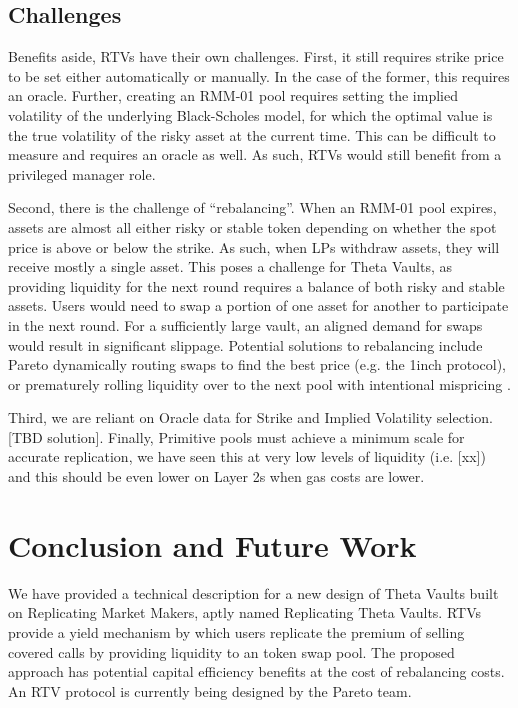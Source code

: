 \documentclass[hidelinks, 12pt]{article}
\begin{document}
\subsection{Challenges}
\label{Challenges}

Benefits aside, RTVs have their own challenges. First, it still requires strike price to be set either automatically or manually. In the case of the former, this requires an oracle. Further, creating an RMM-01 pool requires setting the implied volatility of the underlying Black-Scholes model, for which the optimal value is the true volatility of the risky asset at the current time. This can be difficult to measure and requires an oracle as well. As such, RTVs would still benefit from a privileged manager role.

Second, there is the challenge of ``rebalancing''. When an RMM-01 pool expires, assets are almost all either risky or stable token depending on whether the spot price is above or below the strike. As such, when LPs withdraw assets, they will receive mostly a single asset. This poses a challenge for Theta Vaults, as providing liquidity for the next round requires a balance of both risky and stable assets. Users would need to swap a portion of one asset for another to participate in the next round. For a sufficiently large vault, an aligned demand for swaps would result in significant slippage. Potential solutions to rebalancing include Pareto dynamically routing swaps to find the best price (e.g. the 1inch protocol), or prematurely rolling liquidity over to the next pool with intentional mispricing \cite{sterrett2022replicating}.

Third, we are reliant on Oracle data for Strike and Implied Volatility selection. [TBD solution]. Finally, Primitive pools must achieve a minimum scale for accurate replication, we have seen this at very low levels of liquidity (i.e. [xx]) and this should be even lower on Layer 2s when gas costs are lower.

\section{Conclusion and Future Work}

We have provided a technical description for a new design of Theta Vaults built on Replicating Market Makers, aptly named Replicating Theta Vaults. RTVs provide a yield mechanism by which users replicate the premium of selling covered calls by providing liquidity to an token swap pool. The proposed approach has potential capital efficiency benefits at the cost of rebalancing costs.
An RTV protocol is currently being designed by the Pareto team.
\end{document}

